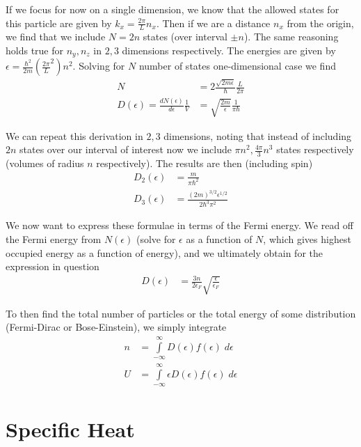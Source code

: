 \documentclass[10pt]{report}
\newcommand{\rd}[2]{\frac{d#1}{d#2}}
\begin{document}
If we focus for now on a single dimension, we know that the allowed states for this particle are given by $k_x = \frac{2\pi}{L}n_x$. Then if we are a distance $n_x$ from the origin, we find that we include $N=2n$ states (over interval $\pm n$). The same reasoning holds true for $n_y, n_z$ in $2,3$ dimensions respectively. The energies are given by $\epsilon = \frac{\hbar^2}{2m}\left( \frac{2\pi}{L}^2 \right)n^2$. Solving for $N$ number of states one-dimensional case we find
\begin{align}
    N &= 2\frac{\sqrt{2m\epsilon}}{\hbar}\frac{L}{2\pi}\\
    D(\epsilon) = \rd{N(\epsilon)}{\epsilon}\frac{1}{V} &= \sqrt{\frac{2m}{\epsilon}}\frac{1}{\pi\hbar}
\end{align}

We can repeat this derivation in $2,3$ dimensions, noting that instead of including $2n$ states over our interval of interest now we include $\pi n^2, \frac{4\pi}{3}n^3$ states respectively (volumes of radius $n$ respectively). The results are then (including spin)
\begin{align}
    D_2(\epsilon) &= \frac{m}{\pi\hbar^2}\\
    D_3(\epsilon) &= \frac{(2m)^{3/2}\epsilon^{1/2}}{2\hbar^3\pi^2}
\end{align}

We now want to express these formulae in terms of the Fermi energy. We read off the Fermi energy from $N(\epsilon)$ (solve for $\epsilon$ as a function of $N$, which gives highest occupied energy as a function of energy), and we ultimately obtain for the expression in question
\begin{align}
    D(\epsilon) &= \frac{3n}{2\epsilon_F}\sqrt{\frac{\epsilon}{\epsilon_F}}
\end{align}

To then find the total number of particles or the total energy of some distribution (Fermi-Dirac or Bose-Einstein), we simply integrate
\begin{align}
    n &= \int\limits_{-\infty}^{\infty}D(\epsilon)f(\epsilon)\;d\epsilon \label{22.10.n}\\
    U &=  \int\limits_{-\infty}^{\infty}\epsilon D(\epsilon)f(\epsilon)\;d\epsilon\label{22.10.U}
\end{align}

\section{Specific Heat}
\end{document}
